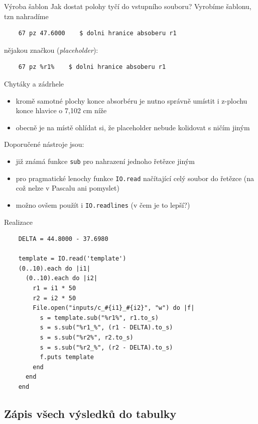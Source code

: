 \documentclass{beamer}
\begin{document}
\begin{frame}[fragile]{Výroba šablon}
  Jak dostat polohy tyčí do vstupního souboru? Vyrobíme šablonu, tzn nahradíme
  \begin{verbatim}
    67 pz 47.6000    $ dolni hranice absoberu r1
  \end{verbatim}
  \pause
  nějakou značkou (\emph{placeholder}):
  \begin{verbatim}
    67 pz %r1%    $ dolni hranice absoberu r1
  \end{verbatim}
\end{frame}

\begin{frame}{Chytáky a zádrhele}
  \begin{itemize}
    \item kromě samotné plochy konce absorbéru je nutno správně umístit i z-plochu konce hlavice o 7,102 cm níže
    \item obecně je na místě ohlídat si, že placeholder nebude kolidovat s ničím jiným
  \end{itemize}
  Doporučené nástroje jsou:
  \begin{itemize}
    \item již známá funkce \texttt{sub} pro nahrazení jednoho řetězce jiným
    \item pro pragmatické lenochy funkce \texttt{IO.read} načítající celý soubor do řetězce (na což nelze v Pascalu ani pomyslet)
    \item možno ovšem použít i \texttt{IO.readlines} (v čem je to lepší?)
  \end{itemize}
\end{frame}

\begin{frame}[fragile]{Realizace}
  \scriptsize
  \begin{verbatim}
    DELTA = 44.8000 - 37.6980

    template = IO.read('template')
    (0..10).each do |i1|
      (0..10).each do |i2|
        r1 = i1 * 50
        r2 = i2 * 50
        File.open("inputs/c_#{i1}_#{i2}", "w") do |f|
          s = template.sub("%r1%", r1.to_s)
          s = s.sub("%r1_%", (r1 - DELTA).to_s)
          s = s.sub("%r2%", r2.to_s)
          s = s.sub("%r2_%", (r2 - DELTA).to_s)
          f.puts template
        end
      end
    end
  \end{verbatim}
\end{frame}

\subsection{Zápis všech výsledků do tabulky}
\end{document}
